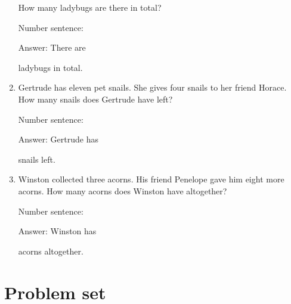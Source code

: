 \documentclass{tufte-book}
\begin{document}
\begin{enumerate}
  How many ladybugs are there in total?\medskip\par
  Number sentence:
  \dotfill\medskip\par
  Answer: There are
  \dotfill\medskip\par\mbox{}\dotfill\medskip\par\mbox{}\dotfill\bigskip
  ladybugs in total.
\item
  Gertrude has eleven pet snails. She gives four snails to her friend
  Horace. How many snails does Gertrude have left?\medskip\par
  Number sentence:
  \dotfill\medskip\par
  Answer: Gertrude has
  \dotfill\medskip\par\mbox{}\dotfill\medskip\par\mbox{}\dotfill\bigskip
  snails left.
\item
  Winston collected three acorns. His friend Penelope gave him eight
  more acorns. How many acorns does Winston have altogether?\medskip\par
  Number sentence:
  \dotfill\medskip\par
  Answer: Winston has
  \dotfill\medskip\par\mbox{}\dotfill\medskip\par\mbox{}\dotfill\bigskip
  acorns altogether.
\end{enumerate}



\clearpage\section{Problem set }
\end{document}
